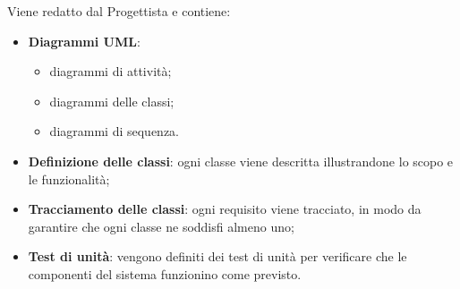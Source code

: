   Viene redatto dal Progettista e contiene:
  \begin{itemize}
     	\item \textbf{Diagrammi UML}:
			\begin{itemize}
				\item{diagrammi di attività;}
   				\item{diagrammi delle classi;}
				\item{diagrammi di sequenza.}
			\end{itemize}
		\item \textbf{Definizione delle classi}: ogni classe viene descritta illustrandone lo scopo e le funzionalità;
		\item \textbf{Tracciamento delle classi}: ogni requisito viene tracciato, in modo da garantire che ogni classe ne soddisfi almeno uno; 
		\item \textbf{Test di unità}: vengono definiti dei test di unità per verificare che le componenti del sistema funzionino come previsto. 
  \end{itemize}
 
